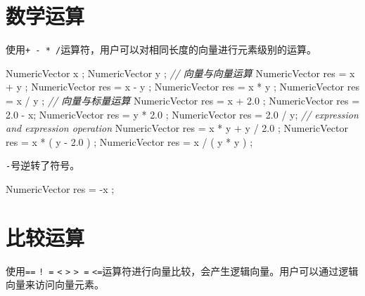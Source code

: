 \documentclass[]{ctexbook}
\newenvironment{Shaded}{\begin{snugshade}}{\end{snugshade}}
\newcommand{\FloatTok}[1]{\textcolor[rgb]{0.00,0.00,0.81}{#1}}
\newcommand{\CommentTok}[1]{\textcolor[rgb]{0.56,0.35,0.01}{\textit{#1}}}
\newcommand{\NormalTok}[1]{#1}
\begin{document}
\section{数学运算}\label{Arithmetic-operations}

使用\texttt{+\ -\ *\ /}运算符，用户可以对相同长度的向量进行元素级别的运算。

\begin{Shaded}
\begin{Highlighting}[]
\NormalTok{NumericVector x ;}
\NormalTok{NumericVector y ;}
\CommentTok{// 向量与向量运算}
\NormalTok{NumericVector res = x + y ;}
\NormalTok{NumericVector res = x - y ;}
\NormalTok{NumericVector res = x * y ;}
\NormalTok{NumericVector res = x / y ;}
\CommentTok{// 向量与标量运算}
\NormalTok{NumericVector res = x   + }\FloatTok{2.0}\NormalTok{ ;}
\NormalTok{NumericVector res = }\FloatTok{2.0}\NormalTok{ - x;}
\NormalTok{NumericVector res = y   * }\FloatTok{2.0}\NormalTok{ ;}
\NormalTok{NumericVector res = }\FloatTok{2.0}\NormalTok{ / y;}
\CommentTok{// expression and expression operation}
\NormalTok{NumericVector res = x * y + y / }\FloatTok{2.0}\NormalTok{ ;}
\NormalTok{NumericVector res = x * ( y - }\FloatTok{2.0}\NormalTok{ ) ;}
\NormalTok{NumericVector res = x / ( y * y ) ;}
\end{Highlighting}
\end{Shaded}

\texttt{-}号逆转了符号。

\begin{Shaded}
\begin{Highlighting}[]
\NormalTok{NumericVector res = -x ;}
\end{Highlighting}
\end{Shaded}

\section{比较运算}\label{Comparison-operations}

使用\texttt{==} \texttt{!\ =} \texttt{\textless{}}
\texttt{\textgreater{}} \texttt{\textgreater{}\ =}
\texttt{\textless{}=}运算符进行向量比较，会产生逻辑向量。用户可以通过逻辑向量来访问向量元素。
\end{document}
